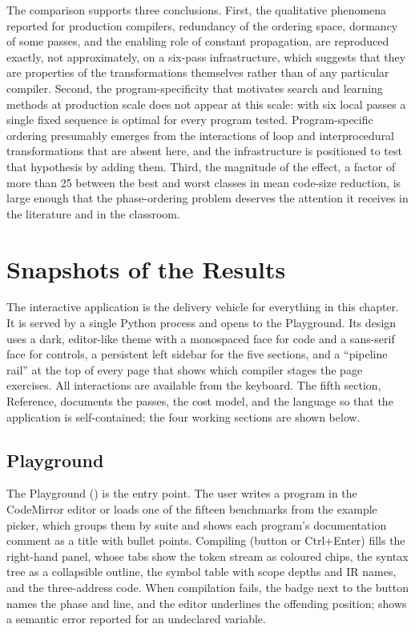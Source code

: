 The comparison supports three conclusions. First, the qualitative phenomena reported for production compilers, redundancy of the ordering space, dormancy of some passes, and the enabling role of constant propagation, are reproduced exactly, not approximately, on a six-pass infrastructure, which suggests that they are properties of the transformations themselves rather than of any particular compiler. Second, the program-specificity that motivates search and learning methods at production scale does not appear at this scale: with six local passes a single fixed sequence is optimal for every program tested. Program-specific ordering presumably emerges from the interactions of loop and interprocedural transformations that are absent here, and the infrastructure is positioned to test that hypothesis by adding them. Third, the magnitude of the effect, a factor of more than 25 between the best and worst classes in mean code-size reduction, is large enough that the phase-ordering problem deserves the attention it receives in the literature and in the classroom.

\section{Snapshots of the Results}
\label{sec:gui}

The interactive application is the delivery vehicle for everything in this chapter. It is served by a single Python process and opens to the Playground. Its design uses a dark, editor-like theme with a monospaced face for code and a sans-serif face for controls, a persistent left sidebar for the five sections, and a ``pipeline rail'' at the top of every page that shows which compiler stages the page exercises. All interactions are available from the keyboard. The fifth section, Reference, documents the passes, the cost model, and the language so that the application is self-contained; the four working sections are shown below.

\subsection{Playground}

The Playground () is the entry point. The user writes a program in the CodeMirror editor or loads one of the fifteen benchmarks from the example picker, which groups them by suite and shows each program's documentation comment as a title with bullet points. Compiling (button or Ctrl+Enter) fills the right-hand panel, whose tabs show the token stream as coloured chips, the syntax tree as a collapsible outline, the symbol table with scope depths and IR names, and the three-address code. When compilation fails, the badge next to the button names the phase and line, and the editor underlines the offending position;  shows a semantic error reported for an undeclared variable.

